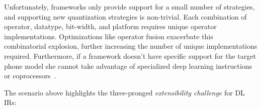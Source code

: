   Unfortunately, frameworks only provide support for a small number
    of strategies, and supporting new quantization strategies is non-trivial.
  Each combination of operator, datatype, bit-width, and
    platform requires unique operator implementations.
  Optimizations like operator fusion exacerbate this combinatorial explosion,
    further increasing
    the number of unique implementations required.
  Furthermore, if a framework doesn't have specific support for
    the target phone model she cannot take advantage of specialized deep learning
    instructions or coprocessors~\citep{apple_neural_engine}.

  The scenario above highlights the three-pronged \textit{extensibility challenge}
    for DL IRs:

